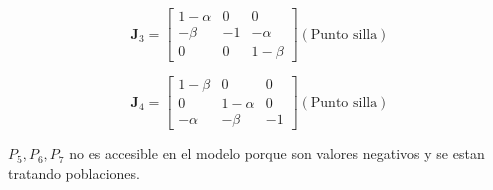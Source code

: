 \documentclass[twocolumn,aps,prl]{revtex4-1}
\newcommand{\talf}{\frac{\alpha - 1}{\alpha \beta - 1} }
\newcommand{\tbet}{\frac{\beta  - 1}{\alpha \beta - 1} }
\begin{document}
$$
\mathbf{J}_3 = 
\begin{bmatrix}
    1 - \alpha  & 0 & 0 \\
    - \beta & -1 & - \alpha \\
    0 & 0 & 1  - \beta
\end{bmatrix} (\text{Punto silla})
$$

$$
\mathbf{J}_4 = 
\begin{bmatrix}
    1 - \beta  & 0 & 0 \\
    0 & 1 -\alpha  & 0 \\
    - \alpha  & -\beta & -1
\end{bmatrix} (\text{Punto silla})
$$




$P_5, P_6, P_7$ no es accesible en el modelo porque son valores negativos y se estan tratando poblaciones.
\end{document}
